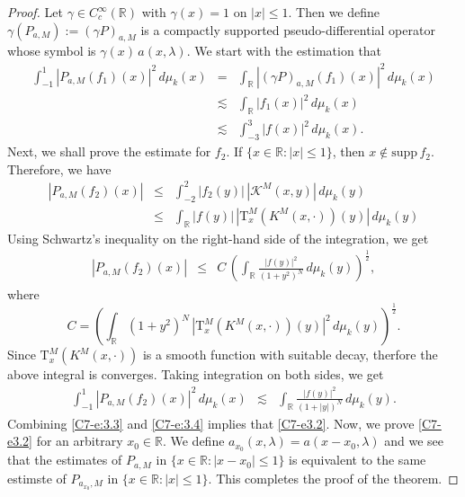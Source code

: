 \documentclass[12pt,a4paper,reqno]{amsproc}
\theoremstyle{definition}
\theoremstyle{remark}
\numberwithin{equation}{section}
\newcommand{\Tau}{\mathrm{T}}
\begin{document}
\begin{proof}
Let $\gamma \in C_c^\infty(\mathbb{R})$ with $\gamma(x)=1$ on $|x|\le 1$. Then we define $\gamma(P_{a,M}) := (\gamma P)_{a,M}$ is a compactly supported pseudo-differential operator whose symbol is $\gamma(x)\,a(x,\lambda)$. We start with the estimation that
\begin{eqnarray}
\nonumber    \int_{-1}^{1} |P_{a,M}(f_1)(x)|^2\,d\mu_k(x) &=& \int_{\mathbb{R}} |
(\gamma P)_{a,M}(f_1)(x)|^2\, d\mu_k(x)\\
\nonumber  &\lesssim&    \int_{\mathbb{R}} |f_1(x)|^2\, d\mu_k(x) \\
  &\lesssim& \int_{-3}^3 |f(x)|^2\, d\mu_k(x).\label{C7-e:3.3}
\end{eqnarray}
Next, we shall prove the estimate for $f_2$. If $\{x\in \mathbb{R}:|x|\le 1\}$, then $x \notin \text{supp}\,f_2$. Therefore,  we have 
\begin{eqnarray*}
   | P_{a,M}(f_2)(x)| &\le& \int_{-2}^2 |f_2(y)|\, |\mathcal{K}^M(x,y)|\,d\mu_k(y)\\
    &\le&  \int_{\mathbb{R}}  |f(y)|\,|\Tau_x^M(K^M(x,\cdot))(y)|\,d\mu_k(y)
    \end{eqnarray*}
    Using Schwartz's inequality on the right-hand side of the integration, we get
    \begin{eqnarray*}
| P_{a,M}(f_2)(x)|    &\le& C\, \left(\int_{\mathbb{R}} \frac{|f(y)|^2}{(1+y^2)^N}\, d\mu_k(y)\right)^{\frac{1}{2}},
    \end{eqnarray*}
where 
\begin{equation*}
    C = \left(\int_{\mathbb{R}}(1+y^2)^N\,|\Tau_x^M(K^M(x,\cdot))(y)|^2\, d\mu_k(y)\right)^{\frac{1}{2}}.
\end{equation*}
Since $\Tau_x^M(K^M(x,\cdot))$ is a smooth function with suitable decay, therfore the above integral is converges.
Taking integration on both sides, we get
    \begin{eqnarray}\label{C7-e:3.4}
\int_{-1}^1  | P_{a,M}(f_2)(x)|^2\,d\mu_k(x)  &\lesssim&  \int_{\mathbb{R}} \frac{|f(y)|^2}{(1+|y|)^N}\, d\mu_k(y).
\end{eqnarray}
Combining \eqref{C7-e:3.3} and \eqref{C7-e:3.4} implies that \eqref{C7-e3.2}.
Now, we prove \eqref{C7-e3.2}   for an arbitrary $x_0\in \mathbb{R}$. We define $a_{x_0}(x,\lambda) = a(x-x_0, \lambda)$ and we see that the estimates of $P_{a,M}$ in $\{x\in \mathbb{R}:|x-x_0| \le 1\}$ is equivalent to  the same estimste of $P_{a_{x_0},M}$ in $\{x\in \mathbb{R}: |x|\le1\}$. This completes the proof of the theorem.
\end{proof} 
\end{document}

